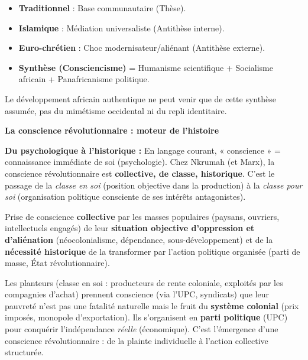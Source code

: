 \documentclass[11pt]{article}
\newcommand{\cle}[1]{{\popxbold\color{popdark}#1}}
\begin{document}
\begin{aretenir}
\begin{itemize}
    \item \textbf{Traditionnel} : Base communautaire (Thèse).
    \item \textbf{Islamique} : Médiation universaliste (Antithèse interne).
    \item \textbf{Euro-chrétien} : Choc modernisateur/aliénant (Antithèse externe).
    \item \textbf{Synthèse (Consciencisme)} = Humanisme scientifique + Socialisme africain + Panafricanisme politique.
\end{itemize}
Le développement africain authentique ne peut venir que de cette synthèse assumée, pas du mimétisme occidental ni du repli identitaire.
\end{aretenir}

\textbf{La conscience révolutionnaire : moteur de l'histoire}\par

\textbf{Du psychologique à l'historique :} En langage courant, « conscience » = connaissance immédiate de soi (psychologie). Chez Nkrumah (et Marx), la \cle{conscience révolutionnaire} est \textbf{collective, de classe, historique}. C'est le passage de la \emph{classe en soi} (position objective dans la production) à la \emph{classe pour soi} (organisation politique consciente de ses intérêts antagonistes).

\begin{definition}
Prise de conscience \textbf{collective} par les masses populaires (paysans, ouvriers, intellectuels engagés) de leur \textbf{situation objective d'oppression et d'aliénation} (néocolonialisme, dépendance, sous-développement) et de la \textbf{nécessité historique} de la transformer par l'action politique organisée (parti de masse, État révolutionnaire).
\end{definition}

\begin{exemplebox}
Les planteurs (classe en soi : producteurs de rente coloniale, exploités par les compagnies d'achat) prennent conscience (via l'UPC, syndicats) que leur pauvreté n'est pas une fatalité naturelle mais le fruit du \textbf{système colonial} (prix imposés, monopole d'exportation). Ils s'organisent en \textbf{parti politique} (UPC) pour conquérir l'indépendance \emph{réelle} (économique). C'est l'émergence d'une conscience révolutionnaire : de la plainte individuelle à l'action collective structurée.
\end{exemplebox}
\end{document}
